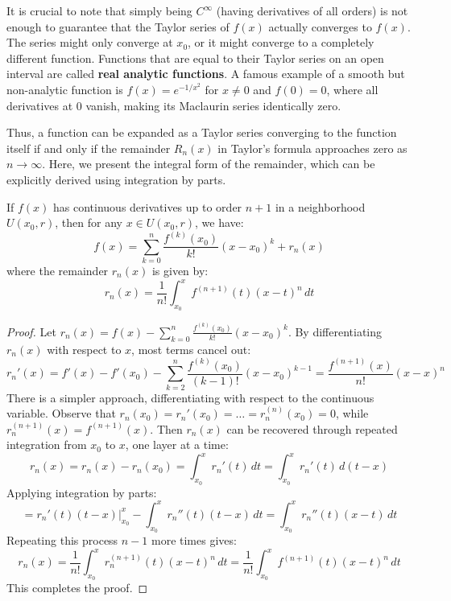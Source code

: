 \begin{remark}[Analyticity]
It is crucial to note that simply being $C^\infty$ (having derivatives of all orders) is not enough to guarantee that the Taylor series of $f(x)$ actually converges to $f(x)$. The series might only converge at $x_0$, or it might converge to a completely different function. Functions that are equal to their Taylor series on an open interval are called \textbf{real analytic functions}. A famous example of a smooth but non-analytic function is $f(x) = e^{-1/x^2}$ for $x \neq 0$ and $f(0) = 0$, where all derivatives at $0$ vanish, making its Maclaurin series identically zero.
\end{remark}

Thus, a function can be expanded as a Taylor series converging to the function itself if and only if the remainder $R_n(x)$ in Taylor's formula approaches zero as $n \to \infty$. Here, we present the integral form of the remainder, which can be explicitly derived using integration by parts.

\begin{theorem}
If $f(x)$ has continuous derivatives up to order $n+1$ in a neighborhood $U(x_0, r)$, then for any $x \in U(x_0, r)$, we have:
\[ f(x) = \sum_{k=0}^{n} \frac{f^{(k)}(x_0)}{k!} (x-x_0)^k + r_n(x) \]
where the remainder $r_n(x)$ is given by:
\[ r_n(x) = \frac{1}{n!} \int_{x_0}^{x} f^{(n+1)}(t) (x-t)^n \, dt \]
\end{theorem}
\begin{proof}
Let $r_n(x) = f(x) - \sum_{k=0}^{n} \frac{f^{(k)}(x_0)}{k!} (x-x_0)^k$. By differentiating $r_n(x)$ with respect to $x$, most terms cancel out:
\[ r_n'(x) = f'(x) - f'(x_0) - \sum_{k=2}^{n} \frac{f^{(k)}(x_0)}{(k-1)!} (x-x_0)^{k-1} = \frac{f^{(n+1)}(x)}{n!} (x-x)^{n} \]
There is a simpler approach, differentiating with respect to the continuous variable. Observe that $r_n(x_0) = r_n'(x_0) = \dots = r_n^{(n)}(x_0) = 0$, while $r_n^{(n+1)}(x) = f^{(n+1)}(x)$.
Then $r_n(x)$ can be recovered through repeated integration from $x_0$ to $x$, one layer at a time:
\[ r_n(x) = r_n(x) - r_n(x_0) = \int_{x_0}^{x} r_n'(t) \, dt = \int_{x_0}^{x} r_n'(t) \, d(t-x) \]
Applying integration by parts:
\[ = r_n'(t)(t-x) \Big|_{x_0}^{x} - \int_{x_0}^{x} r_n''(t)(t-x) \, dt = \int_{x_0}^{x} r_n''(t)(x-t) \, dt \]
Repeating this process $n-1$ more times gives:
\[ r_n(x) = \frac{1}{n!} \int_{x_0}^{x} r_n^{(n+1)}(t) (x-t)^n \, dt = \frac{1}{n!} \int_{x_0}^{x} f^{(n+1)}(t) (x-t)^n \, dt \]
This completes the proof.
\end{proof}

